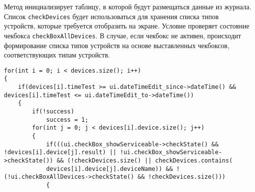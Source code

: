 Метод инициализирует таблицу, в которой будут размещаться данные из журнала. Список \texttt{checkDevices} будет
использоваться для хранения списка типов устройств, которые требуется отобразить на экране. Условие проверяет состояние
чекбокса \texttt{checkBoxAllDevices}. В случае, если чекбокс не активен, происходит формирование списка типов устройств
на основе выставленных чекбоксов, соответствующих типам устройств.
\medskip
\begin{verbatim}
for(int i = 0; i < devices.size(); i++)
{
	if(devices[i].timeTest >= ui.dateTimeEdit_since->dateTime() && devices[i].timeTest <= ui.dateTimeEdit_to->dateTime())
	{
		if(!success)
			success = 1;
		for(int j = 0; j < devices[i].device.size(); j++)
		{
			if(((ui.checkBox_showServiceable->checkState() && !devices[i].device[j].result) || !ui.checkBox_showServiceable->checkState()) && (!checkDevices.size() || checkDevices.contains(
			devices[i].device[j].deviceName)) && !(!ui.checkBoxAllDevices->checkState() && !checkDevices.size()))
			{
\end{verbatim}
\medskip

